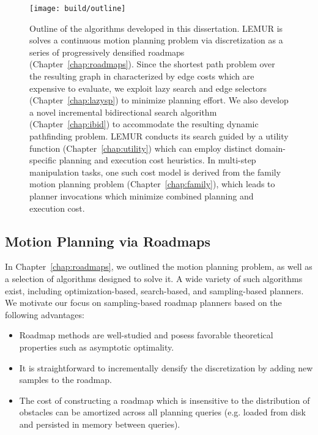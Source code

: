\begin{figure}[t]
   \centering
   \texttt{[image: build/outline]}
   \caption{Outline of the algorithms developed in this dissertation.
      LEMUR is solves a continuous motion planning problem via
      discretization as a series of progressively densified roadmaps
      (Chapter~\ref{chap:roadmaps}).
      Since the shortest path problem over the resulting graph
      in characterized by edge costs which are expensive to evaluate,
      we exploit lazy search and edge selectors
      (Chapter~\ref{chap:lazysp}) to minimize planning effort.
      We also develop a novel incremental bidirectional search
      algorithm (Chapter~\ref{chap:ibid}) to accommodate the resulting
      dynamic pathfinding problem.
      LEMUR conducts its search guided by a utility function
      (Chapter~\ref{chap:utility}) which can employ distinct
      domain-specific planning and execution cost heuristics.
      In multi-step manipulation tasks,
      one such cost model is derived from the family motion planning
      problem (Chapter~\ref{chap:family}),
      which leads to planner invocations which minimize combined
      planning and execution cost.
      }
   \label{fig:conclusion:outline}
\end{figure}

\subsection{Motion Planning via Roadmaps}

In Chapter~\ref{chap:roadmaps},
we outlined the motion planning problem,
as well as a selection of algorithms designed to solve it.
A wide variety of such algorithms exist,
including optimization-based, search-based, and sampling-based
planners.
We motivate our focus on sampling-based roadmap planners
based on the following advantages:
\begin{itemize}
\item Roadmap methods are well-studied and posess favorable
   theoretical properties such as asymptotic optimality.
\item It is straightforward to incrementally densify the
   discretization by adding new samples to the roadmap.
\item The cost of constructing a roadmap which is
   insensitive to the distribution of obstacles can be amortized
   across all planning queries
   (e.g. loaded from disk and persisted in memory between queries).
\end{itemize}

